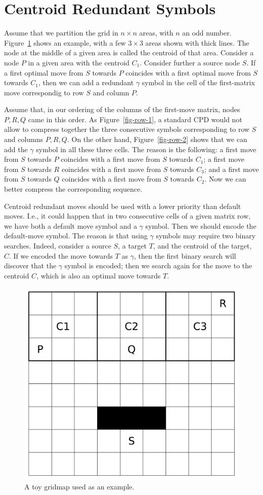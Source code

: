 \section{Centroid Redundant Symbols}
\label{sec:sac}

Assume that we partition the grid in $n \times n$ areas, with $n$ an odd number.
Figure~\ref{fig-grid} shows an example, with a few $3 \times 3$ areas shown with thick lines.
The node at the middle of a given area is called the centroid of that area.
Consider a node $P$ in a given area with the centroid $C_1$.
Consider further a source node $S$.
If a first optimal move from $S$ towards $P$ coincides with a first optimal
move from $S$ towards $C_1$, then we can add a redundant $\gamma$ symbol
in the cell of the first-matrix move correspondig to row $S$ and column $P$.

Assume that, in our ordering of the columns of the first-move matrix,
nodes $P,R,Q$ came in this order.
As Figure~\ref{fig-row-1}, a standard CPD would not allow to compress together
the three consecutive symbols corresponding to row $S$ and columns $P,R,Q$.
On the other hand, Figure~\ref{fig-row-2} shows that we can add the $\gamma$ symbol
in all these three cells.
The reason is the following: a first move from $S$ towards $P$ coincides with a first move from $S$ towards $C_1$;
a first move from $S$ towards $R$ coincides with a first move from $S$ towards $C_3$;
and a first move from $S$ towards $Q$ coincides with a first move from $S$ towards $C_2$.
Now we can better compress the corresponding sequence.

Centroid redundant moves should be used with a lower priority than default moves.
I.e., it could happen that in two consecutive cells of a given matrix row,
we have both a default move symbol and a $\gamma$ symbol.
Then we should encode the default-move symbol.
The reason is that using $\gamma$ symbols may require two binary searches.
Indeed, consider a source $S$, a target $T$, and the centroid of the target, $C$.
If we encoded the move towards $T$ as $\gamma$,
then the first binary search
will discover that the $\gamma$ symbol is encoded; then we search again
for the move to the centroid $C$, which is also an optimal move towards $T$.

\begin{figure}[tb]
	\centering
	\includegraphics[width=.5\columnwidth]{gridmap.pdf}
	\caption{A toy gridmap used as an example.}
	\label{fig-grid}
\end{figure}


